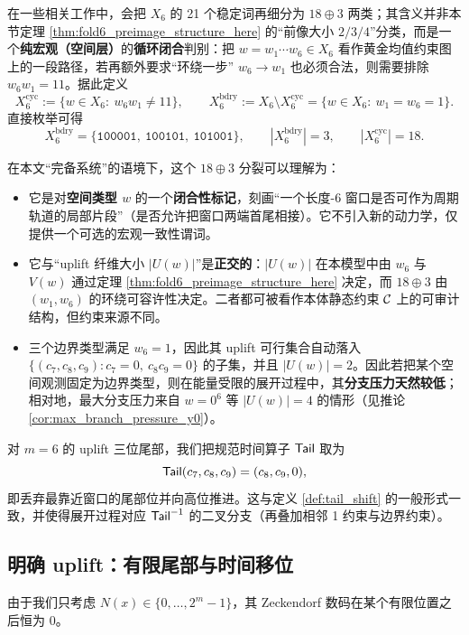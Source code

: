 \begin{remark}\label{rem:18_plus_3_in_this_paper}
在一些相关工作中，会把 \(X_6\) 的 21 个稳定词再细分为 \(18\oplus 3\) 两类；其含义并非本节定理 \ref{thm:fold6_preimage_structure_here} 的“前像大小 \(2/3/4\)”分类，而是一个\textbf{纯宏观（空间层）}的\textbf{循环闭合}判别：把 \(w=w_1\cdots w_6\in X_6\) 看作黄金均值约束图上的一段路径，若再额外要求“环绕一步” \(w_6\to w_1\) 也必须合法，则需要排除 \(w_6w_1=11\)。据此定义
$$
X_6^{\mathrm{cyc}}:=\{w\in X_6:\ w_6w_1\neq 11\},\qquad
X_6^{\mathrm{bdry}}:=X_6\setminus X_6^{\mathrm{cyc}}=\{w\in X_6:\ w_1=w_6=1\}.
$$
直接枚举可得
$$
X_6^{\mathrm{bdry}}=\{\texttt{100001},\ \texttt{100101},\ \texttt{101001}\},\qquad |X_6^{\mathrm{bdry}}|=3,\qquad |X_6^{\mathrm{cyc}}|=18.
$$

在本文“完备系统”的语境下，这个 \(18\oplus 3\) 分裂可以理解为：
\begin{itemize}
  \item 它是对\textbf{空间类型 \(w\)} 的一个\textbf{闭合性标记}，刻画“一个长度-6 窗口是否可作为周期轨道的局部片段”（是否允许把窗口两端首尾相接）。它不引入新的动力学，仅提供一个可选的宏观一致性谓词。
  \item 它与“uplift 纤维大小 \(|U(w)|\)”是\textbf{正交的}：\(|U(w)|\) 在本模型中由 \(w_6\) 与 \(V(w)\) 通过定理 \ref{thm:fold6_preimage_structure_here} 决定，而 \(18\oplus 3\) 由 \((w_1,w_6)\) 的环绕可容许性决定。二者都可被看作本体静态约束 \(\mathcal{C}\) 上的可审计结构，但约束来源不同。
  \item 三个边界类型满足 \(w_6=1\)，因此其 uplift 可行集合自动落入 \(\{(c_7,c_8,c_9):c_7=0,\ c_8c_9=0\}\) 的子集，并且 \(|U(w)|=2\)。因此若把某个空间观测固定为边界类型，则在能量受限的展开过程中，其\textbf{分支压力天然较低}；相对地，最大分支压力来自 \(w=0^6\) 等 \(|U(w)|=4\) 的情形（见推论 \ref{cor:max_branch_pressure_y0}）。
\end{itemize}
\end{remark}

\begin{remark}[时间算子在基例的显式形式]\label{rem:m6_tail_shift}
对 \(m=6\) 的 uplift 三位尾部，我们把规范时间算子 \(\mathsf{Tail}\) 取为
$$
\mathsf{Tail}(c_7,c_8,c_9)=(c_8,c_9,0),
$$
即丢弃最靠近窗口的尾部位并向高位推进。这与定义 \ref{def:tail_shift} 的一般形式一致，并使得展开过程对应 \(\mathsf{Tail}^{-1}\) 的二叉分支（再叠加相邻 1 约束与边界约束）。
\end{remark}

\subsection{明确 uplift：有限尾部与时间移位}
由于我们只考虑 \(N(x)\in\{0,\dots,2^m-1\}\)，其 Zeckendorf 数码在某个有限位置之后恒为 0。

